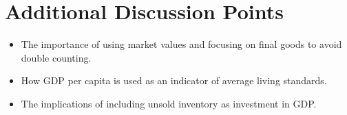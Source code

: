 \section*{Additional Discussion Points}
\begin{itemize}
    \item The importance of using market values and focusing on final goods to avoid double counting.
    \item How GDP per capita is used as an indicator of average living standards.
    \item The implications of including unsold inventory as investment in GDP.
\end{itemize}